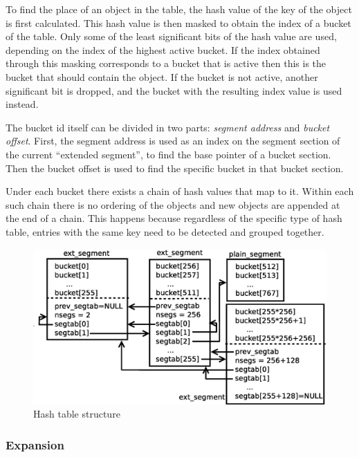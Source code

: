 \documentclass[aps,pre,preprint,nofootinbib]{revtex4}
\begin{document}
To find the place of an object in the table, the hash value of the key of the object is first calculated.
This hash value is then masked to obtain the index of a bucket of the table.
Only some of the least significant bits of the hash value are used, depending on the index of the highest active bucket.
If the index obtained through this masking corresponds to a bucket that is active then this is the bucket that should contain the object.
If the bucket is not active, another significant bit is dropped, and the bucket with the resulting index value is used instead.

The bucket id itself can be divided in two parts: \emph{segment address} and \emph{bucket offset}.
First, the segment address is used as an index on the segment section of the current ``extended segment'', to find the base pointer of a bucket section.
Then the bucket offset is used to find the specific bucket in that bucket section.

Under each bucket there exists a chain of hash values that map to it.
Within each such chain there is no ordering of the objects and new objects are appended at the end of a chain.
This happens because regardless of the specific type of hash table, entries with the same key need to be detected and grouped together.

\begin{figure}[htb]
  \centering
  \includegraphics[width=1.0\textwidth]{hash_table_structure.eps}
  \caption{Hash table structure}
  \label{fig:hash_table_structure}
\end{figure}

\subsubsection{Expansion}
\end{document}
